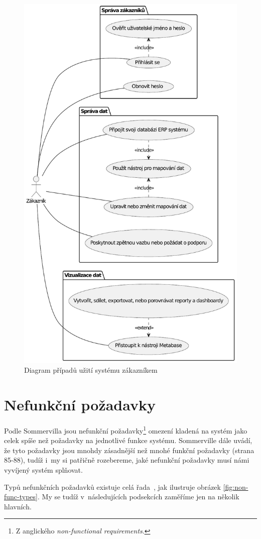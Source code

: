 \begin{figure}
    \centering
    \includegraphics[width=0.75\linewidth]{img/Use Case diagram - Zákazník (2).pdf}
    \caption{Diagram případů užití systému zákazníkem}
    \label{fig:customer-use-cases}
\end{figure}


\section{Nefunkční požadavky}

Podle Sommervilla jsou nefunkční požadavky\footnote{Z anglického \textit{non-functional requirements}.} omezení kladená na systém jako celek spíše než požadavky na jednotlivé funkce systému.
Sommerville dále uvádí, že tyto požadavky jsou mnohdy zásadnější než mnohé funkční požadavky \cite{Sommerville}(strana 85-88), tudíž i~my si patřičně rozebereme, jaké nefunkční požadavky musí námi vyvíjený systém splňovat.

Typů nefunkčních požadavků existuje celá řada~\cite{NonFunct69:online}, jak ilustruje obrázek \ref{fig:non-func-types}. My se tudíž v~následujících podsekcích zaměříme jen na několik hlavních.

